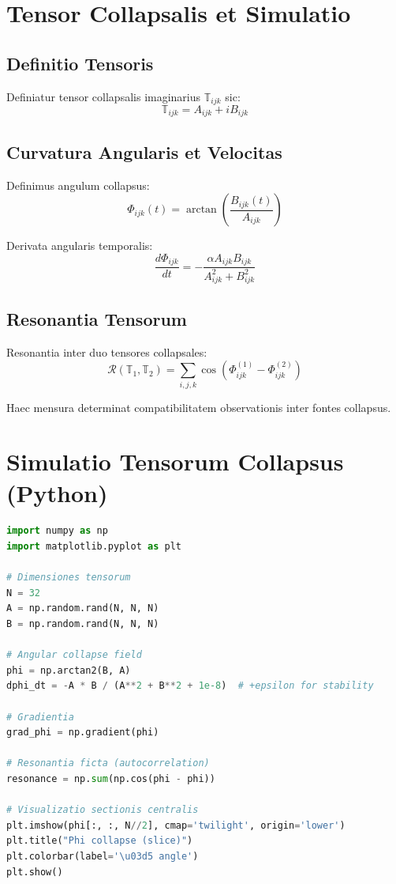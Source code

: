 \section*{Tensor Collapsalis et Simulatio}

\subsection*{Definitio Tensoris}

Definiatur tensor collapsalis imaginarius \( \mathbb{T}_{ijk} \) sic:
\[
\mathbb{T}_{ijk} = A_{ijk} + i B_{ijk}
\]

\subsection*{Curvatura Angularis et Velocitas}

Definimus angulum collapsus:
\[
\Phi_{ijk}(t) = \arctan\left( \frac{B_{ijk}(t)}{A_{ijk}} \right)
\]

Derivata angularis temporalis:
\[
\frac{d\Phi_{ijk}}{dt} = -\frac{\alpha A_{ijk} B_{ijk}}{A_{ijk}^2 + B_{ijk}^2}
\]

\subsection*{Resonantia Tensorum}

Resonantia inter duo tensores collapsales:
\[
\mathcal{R}(\mathbb{T}_1, \mathbb{T}_2) = \sum_{i,j,k} \cos\left( \Phi^{(1)}_{ijk} - \Phi^{(2)}_{ijk} \right)
\]

Haec mensura determinat compatibilitatem observationis inter fontes collapsus.

\section*{Simulatio Tensorum Collapsus (Python)}

\begin{lstlisting}[language=Python, caption=Simulatio Tensoris Collapsalis]
import numpy as np
import matplotlib.pyplot as plt

# Dimensiones tensorum
N = 32
A = np.random.rand(N, N, N)
B = np.random.rand(N, N, N)

# Angular collapse field
phi = np.arctan2(B, A)
dphi_dt = -A * B / (A**2 + B**2 + 1e-8)  # +epsilon for stability

# Gradientia
grad_phi = np.gradient(phi)

# Resonantia ficta (autocorrelation)
resonance = np.sum(np.cos(phi - phi))

# Visualizatio sectionis centralis
plt.imshow(phi[:, :, N//2], cmap='twilight', origin='lower')
plt.title("Phi collapse (slice)")
plt.colorbar(label='\u03d5 angle')
plt.show()
\end{lstlisting}

